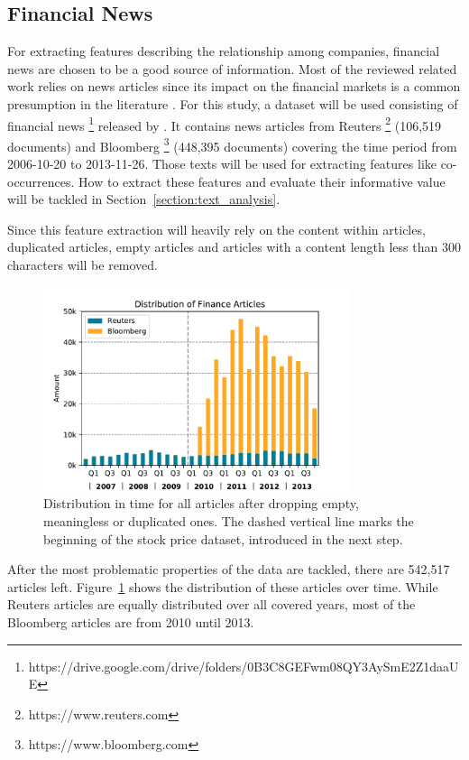 \subsection{Financial News}
For extracting features describing the relationship among companies, financial news are chosen to be a good source of information. Most of the reviewed related work relies on news articles since its impact on the financial markets is a common presumption in the literature \cite{KhadjehNassirtoussi2014TextReview}. For this study, a dataset will be used consisting of financial news \footnote{https://drive.google.com/drive/folders/0B3C8GEFwm08QY3AySmE2Z1daaUE} released by \citet{Ding2014UsingInvestigation}. It contains news articles from Reuters \footnote{https://www.reuters.com} (106,519 documents) and Bloomberg \footnote{https://www.bloomberg.com} (448,395 documents) covering the time period from 2006-10-20 to 2013-11-26. Those texts will be used for extracting features like co-occurrences. How to extract these features and evaluate their informative value will be tackled in Section~\ref{section:text_analysis}.

Since this feature extraction will heavily rely on the content within articles, duplicated articles, empty articles and articles with a content length less than 300 characters will be removed.

\begin{figure}[!ht]
    \centering
    \includegraphics[width=0.8\textwidth]{figures/data/articles-distribution.pdf}
    \caption{Distribution in time for all articles after dropping empty, meaningless or duplicated ones. The dashed vertical line marks the beginning of the stock price dataset, introduced in the next step.}
    \label{fig:articles-distribution}
\end{figure}

After the most problematic properties of the data are tackled, there are 542,517 articles left. Figure~\ref{fig:articles-distribution} shows the distribution of these articles over time. While Reuters articles are equally distributed over all covered years, most of the Bloomberg articles are from 2010 until 2013.


